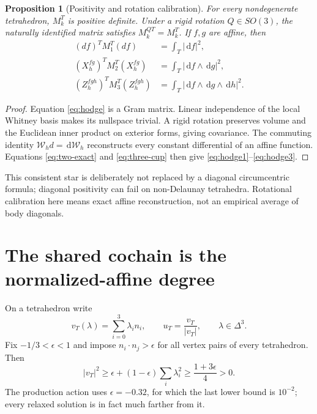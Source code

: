 \documentclass[11pt]{article}
\newtheorem{proposition}[theorem]{Proposition}
\newcommand{\dd}{\,\mathrm d}
\newcommand{\Wh}{\mathcal W_h}
\begin{document}
\begin{proposition}[Positivity and rotation calibration]
For every nondegenerate tetrahedron, $M_k^T$ is positive definite.  Under a
rigid rotation $Q\in SO(3)$, the naturally identified matrix satisfies
$M_k^{QT}=M_k^T$.  If $f,g$ are affine, then
\begin{align}
 (df)^TM_1^T(df)&=\int_T|\dd f|^2,\label{eq:hodge1}\\
 (X_h^{fg})^TM_2^T(X_h^{fg})&=\int_T|\dd f\wedge\dd g|^2,
 \label{eq:hodge2}\\
 (Z_h^{fgh})^TM_3^T(Z_h^{fgh})&=\int_T|\dd f\wedge\dd g\wedge\dd h|^2.
 \label{eq:hodge3}
\end{align}
\end{proposition}

\begin{proof}
Equation \eqref{eq:hodge} is a Gram matrix.  Linear independence of the local
Whitney basis makes its nullspace trivial.  A rigid rotation preserves volume
and the Euclidean inner product on exterior forms, giving covariance.  The
commuting identity $\Wh d=\dd\Wh$ reconstructs every constant differential
of an affine function.  Equations \eqref{eq:two-exact} and
\eqref{eq:three-cup} then give \eqref{eq:hodge1}--\eqref{eq:hodge3}.
\end{proof}

This consistent star is deliberately not replaced by a diagonal
circumcentric formula; diagonal positivity can fail on non-Delaunay
tetrahedra.  Rotational calibration here means exact affine reconstruction,
not an empirical average of body diagonals.

\section{The shared cochain is the normalized-affine degree}

On a tetrahedron write
\begin{equation}
 v_T(\lambda)=\sum_{i=0}^3\lambda_i n_i,
 \qquad u_T=\frac{v_T}{|v_T|},
 \qquad \lambda\in\Delta^3.
 \label{eq:normalize}
\end{equation}
Fix $-1/3<\epsilon<1$ and impose
$n_i\cdot n_j>\epsilon$ for all vertex pairs of every tetrahedron.  Then
\begin{equation}
 |v_T|^2
 \ge \epsilon+(1-\epsilon)\sum_i\lambda_i^2
 \ge\frac{1+3\epsilon}{4}>0.
 \label{eq:affine-gap}
\end{equation}
The production action uses $\epsilon=-0.32$, for which the last lower bound
is $10^{-2}$; every relaxed solution is in fact much farther from it.
\end{document}
